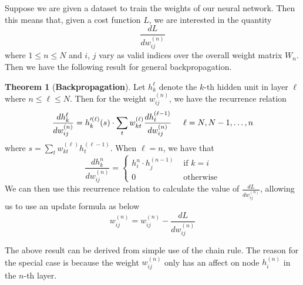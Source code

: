 \documentclass[12pt,letterpaper]{book}
\theoremstyle{definition}
\newtheorem{theorem}{Theorem}[section]
\begin{document}
    Suppose we are given a dataset to train the weights of our neural network. 
    Then this means that, given a cost function $L$, we are interested in the quantity
    \[
      \frac{dL}{dw_{ij}^{(n)}} 
    \] 
    where $1 \le n \le N$ and $i$, $j$ vary as valid indices over the overall weight matrix 
    $W_n$. Then we have the following result for general backpropagation.

    \begin{theorem}[\textbf{Backpropagation}]
      Let $h_{k}^{\ell}$ denote the $k$-th hidden unit in layer $\ell$ where $n \le \ell \le N$.
      Then for the weight $w^{(n)}_{ij}$, we have the recurrence relation 
      \[
        \frac{dh_k^{\ell}}{dw^{(n)}_{ij}}
        =
        h_k^{\prime(\ell)}(s)
        \cdot
        \sum_{t}w_{kt}^{(\ell)}\frac{dh^{(\ell-1)}_t}{dw^{(n)}_{ij}} 
        \hspace{0.5cm} \ell = N, N-1, \dots, n
      \]
      where $s =\sum_{t}w^{(\ell)}_{kt}h^{(\ell-1)}_t$.
      When
      $\ell = n$, we have that
      \[
        \frac{dh_k^{n}}{dw^{(n)}_{ij}} = 
        \begin{cases}
          h_i^n \cdot h_j^{(n -1)} & \text{ if } k = i\\
          0 & \text{ otherwise}
        \end{cases}
      \]
      We can then use this recurrence relation to calculate the value of 
      $\frac{dL}{dw^{(n)}_{ij}}$, allowing us to use an update formula as below
      \[
        w^{(n)}_{ij} = w^{(n)}_{ij} - \frac{dL}{dw^{(n)}_{ij}}
      \]
    \end{theorem}

    The above result can be derived from simple use of the chain rule. The reason
    for the special case is because the weight $w_{ij}^{(n)}$
    only has an affect on node $h_i^{(n)}$ in the $n$-th layer.
\end{document}
